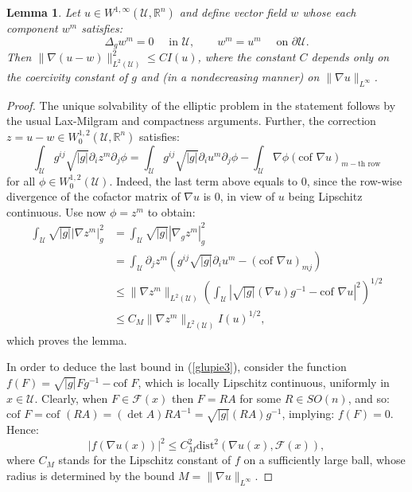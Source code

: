 \documentclass[leqno,twoside, 11pt]{amsart}
\theoremstyle{plain}
\newtheorem{lemma}[theorem]{Lemma}
\theoremstyle{definition}
\numberwithin{equation}{section}
\numberwithin{figure}{section}
\begin{document}
\begin{lemma}\label{lem2.4}
Let $u\in W^{1,\infty}(\mathcal{U},\mathbb{R}^n)$ and define vector field $w$
whose each component $w^m$ satisfies:
$$\Delta_g w^m = 0 \quad \mbox{ in } \mathcal{U}, \qquad
w^m = u^m \quad \mbox{ on } \partial\mathcal{U}.$$
Then $\|\nabla (u-w)\|_{L^2(\mathcal{U})}^2\leq C I(u)$, where the constant
$C$ depends only on the coercivity constant of $g$ and (in a nondecreasing
manner) on $\|\nabla u\|_{L^\infty}$.
\end{lemma}
\begin{proof}
The unique solvability of the elliptic problem in the statement follows 
by the usual Lax-Milgram and compactness arguments. 
Further, the correction $z=u-w\in W^{1,2}_0(\mathcal{U},\mathbb{R}^n)$ satisfies:
$$ \int_\mathcal{U} g^{ij}\sqrt{|g|} \partial_i z^m \partial_j\phi
= \int_{\mathcal{U}} g^{ij}\sqrt{|g|} \partial_i u^m\partial_j\phi
- \int_\mathcal{U} \nabla\phi (\mbox{cof } \nabla u)_{m-\mbox{th row}}$$
for all $\phi\in W^{1,2}_0(\mathcal U)$.
Indeed, the last term above 
equals to $0$, since the row-wise divergence of the cofactor
matrix of $\nabla u$ is $0$, in view of $u$ being Lipschitz continuous.
Use now $\phi=z^m$ to obtain:
\begin{equation}\label{glupie3}
\begin{split}
\int_{\mathcal{U}}\sqrt{|g|} |\nabla z^m|_g^2 & =
\int_{\mathcal{U}}\sqrt{|g|} |\nabla_g z^m|_g^2\\
&= \int_{\mathcal{U}} \partial_j z^m \left(g^{ij}\sqrt{|g|}\partial_i u^m 
- (\mbox{cof } \nabla u)_{mj}\right)\\
&\leq \|\nabla z^m\|_{L^2(\mathcal{U})} \left(\int_{\mathcal{U}}\left|\sqrt{|g|} (\nabla u)
g^{-1} - \mbox{cof }\nabla u \right|^2\right)^{1/2}\\
&\leq C_M \|\nabla z^m\|_{L^2(\mathcal{U})} I(u)^{1/2},
\end{split}
\end{equation}
which proves the lemma.

In order to deduce the last bound in (\ref{glupie3}), consider the function 
$f(F) = \sqrt{|g|} F g^{-1} - \mbox{cof } F$, which is locally Lipschitz
continuous, uniformly in $x\in\mathcal{U}$. 
Clearly, when $F\in \mathcal{F}(x)$ then $F=RA$ for some $R\in SO(n)$, and so:
$\mbox{cof } F =  \mbox{cof } (RA) = (\det A) R A^{-1} = \sqrt{|g|} (RA) g^{-1}$,
implying: $f(F) = 0$. Hence:
$$|f(\nabla u(x))|^2\leq C_M^2 \mbox{dist}^2(\nabla u(x), \mathcal{F}(x)),$$
where $C_M$ stands for the Lipschitz constant of $f$ 
on a sufficiently large ball, 
whose radius is determined by the bound $M = \|\nabla u\|_{L^\infty}$.
\end{proof}
\end{document}
